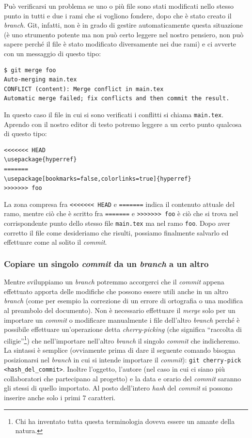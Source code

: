 \documentclass[a4paper,12pt,oneside]{article}
\begin{document}
Può verificarsi un problema se uno o più file sono stati modificati nello stesso
punto in tutti e due i rami che si vogliono fondere, dopo che è stato creato il
\emph{branch}. Git, infatti, non è in grado di gestire automaticamente questa
situazione (è uno strumento potente ma non può certo leggere nel nostro pensiero,
non può sapere perché il file è stato modificato diversamente nei due rami) e ci
avverte con un messaggio di questo tipo:
\begin{lstlisting}[language={}]
$ git merge foo
Auto-merging main.tex
CONFLICT (content): Merge conflict in main.tex
Automatic merge failed; fix conflicts and then commit the result.
\end{lstlisting}
In questo caso il file in cui si sono verificati i conflitti si chiama
\lstinline|main.tex|. Aprendo con il nostro editor di testo potremo leggere
a un certo punto qualcosa di questo tipo:
\begin{lstlisting}[language={},emph={HEAD,foo}]
<<<<<<< HEAD
\usepackage{hyperref}
=======
\usepackage[bookmarks=false,colorlinks=true]{hyperref}
>>>>>>> foo
\end{lstlisting}
La zona compresa fra \lstinline|<<<<<<< HEAD| e \lstinline|=======| indica il
contenuto attuale del ramo, mentre ciò che è scritto fra \lstinline|=======| e
\lstinline|>>>>>>> foo| è ciò che si trova nel corrispondente punto dello stesso
file \lstinline|main.tex| ma nel ramo \lstinline|foo|. Dopo aver corretto il file
come desideriamo che risulti, possiamo finalmente salvarlo ed effettuare come al
solito il \emph{commit}.

\subsubsection{Copiare un singolo \emph{commit} da un \emph{branch} a un altro}
Mentre sviluppiamo un \emph{branch} potremmo accorgerci che il \emph{commit} appena
effettuato apporta delle modifiche che possono essere utili anche in un altro
\emph{branch} (come per esempio la correzione di un errore di ortografia o una
modifica al preambolo del documento). Non è necessario effettuare il \emph{merge}
solo per un importare un \emph{commit} o modificare manualmente i file dell'altro
\emph{branch} perché è possibile effettuare un'operazione detta
\emph{cherry-picking} (che significa ``raccolta di ciligie''\footnote{Chi ha
  inventato tutta questa terminologia doveva essere un amante della natura.}) che
nell'importare nell'altro \emph{branch} il singolo \emph{commit} che
indicheremo. La sintassi è semplice (ovviamente prima di dare il seguente comando
bisogna posizionarsi nel \emph{branch} in cui si intende importare il \emph{commit}):
\lstinline|git cherry-pick <hash_del_commit>|. Inoltre l'oggetto, l'autore (nel
caso in cui ci siano più collaboratori che partecipano al progetto) e la data e
orario del \emph{commit} saranno gli stessi di quello importato. Al posto
dell'intero \emph{hash} del \emph{commit} si possono inserire anche solo i primi
$7$ caratteri.
\end{document}
